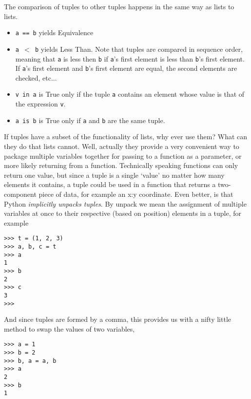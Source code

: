 The comparison of tuples to other tuples happens in the same way as   lists to lists.
\begin{itemize}
	\item 
\texttt{a == b} yields Equivalence
	\item 
\texttt{a $<$ b} yields Less Than. Note that tuples are    compared in sequence order, meaning that \texttt{a} is less then \texttt{b} if    \texttt{a}'s first element is less than \texttt{b}'s first element. If \texttt{a}'s first    element and \texttt{b}'s first element are equal, the second elements are    checked, etc...
	\item 
\texttt{v in a} is True only if the tuple \texttt{a} contains an    element whose value is that of the expression \texttt{v}.
	\item 
\texttt{a is b} is True only if \texttt{a} and \texttt{b} are the same    tuple.
\end{itemize}

If tuples have a subset of the functionality of lists, why ever use   them? What can they do that lists cannot. Well, actually they provide a   very convenient way to package multiple variables together for passing   to a function as a parameter, or more likely returning from a function.   Technically speaking functions can only return one value, but since a   tuple is a single `value' no matter how many elements it contains, a   tuple could be used in a function that returns a two-component piece of   data, for example an x:y coordinate. Even better, is that Python   \textit{implicitly unpacks tuples}. By unpack we mean the   assignment of multiple variables at once to their respective (based on   position) elements in a tuple, for example
\begin{lstlisting}
>>> t = (1, 2, 3)
>>> a, b, c = t
>>> a
1
>>> b
2
>>> c
3
>>>
\end{lstlisting}

And since tuples are formed by a comma, this provides us with a   nifty little method to swap the values of two variables,
\begin{lstlisting}
>>> a = 1
>>> b = 2
>>> b, a = a, b
>>> a
2
>>> b
1
\end{lstlisting}

